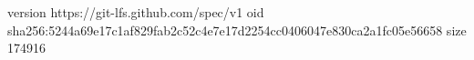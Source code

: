 version https://git-lfs.github.com/spec/v1
oid sha256:5244a69e17c1af829fab2c52c4e7e17d2254cc0406047e830ca2a1fc05e56658
size 174916
